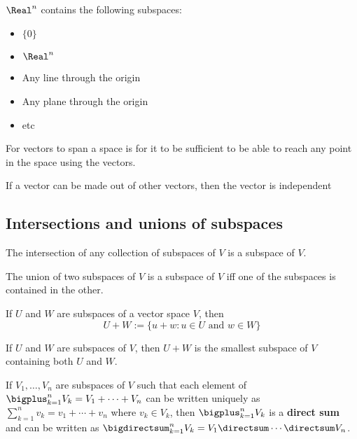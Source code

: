 \begin{theorem}
  $\Real^n$ contains the following subspaces:
  \begin{itemize}
    \item $\{ 0 \}$
    \item $\Real^n$
    \item Any line through the origin
    \item Any plane through the origin
    \item etc
  \end{itemize}
\end{theorem}

\begin{definition}[Spanning]
  For vectors to span a space is for it to be sufficient to be able to reach any point in the space using the vectors.
\end{definition}

\begin{definition}[Independence]
  If a vector can be made out of other vectors, then the vector is independent
\end{definition}

\subsection{Intersections and unions of subspaces}

\begin{theorem}
  The intersection of any collection of subspaces of $V$ is a subspace of $V$.
\end{theorem}

\begin{theorem}
  The union of two subspaces of $V$ is a subspace of $V$ iff one of the subspaces is contained in the other.
\end{theorem}

\begin{definition}
  If $U$ and $W$ are subspaces of a vector space $V$, then
  \[
    U + W := \{ u + w : u \in U \text{ and } w \in W \}
  \]
\end{definition}

\begin{theorem}
  If $U$ and $W$ are subspaces of $V$, then $U + W$ is the smallest subspace of $V$ containing both $U$ and $W$.
\end{theorem}

\begin{definition}
  If $V_1, \ldots, V_n$ are subspaces of $V$ such that each element of $\bigplus_{k = 1}^n V_k = V_1 + \cdots + V_n$ can be written uniquely as $\sum_{k = 1}^n v_k = v_1 + \cdots + v_n$ where $v_k \in V_k$, then $\bigplus_{k = 1}^n V_k$ is a \textbf{direct sum} and can be written as $\bigdirectsum_{k = 1}^n V_k = V_1 \directsum \cdots \directsum V_n$.
\end{definition}

